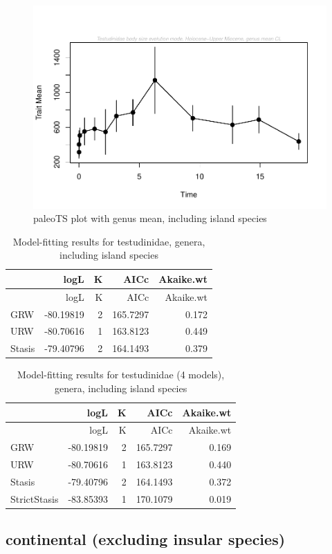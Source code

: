 \documentclass[]{article}
\begin{document}
\begin{figure}[htbp]
\centering
\includegraphics{MA_JJ_files/figure-latex/paleoTS plot with genus mean, including island species-1.pdf}
\caption{paleoTS plot with genus mean, including island species}
\end{figure}

\begin{longtable}[]{@{}lrrrr@{}}
\caption{Model-fitting results for testudinidae, genera, including
island species}\tabularnewline
\toprule
& logL & K & AICc & Akaike.wt\tabularnewline
\midrule
\endfirsthead
\toprule
& logL & K & AICc & Akaike.wt\tabularnewline
\midrule
\endhead
GRW & -80.19819 & 2 & 165.7297 & 0.172\tabularnewline
URW & -80.70616 & 1 & 163.8123 & 0.449\tabularnewline
Stasis & -79.40796 & 2 & 164.1493 & 0.379\tabularnewline
\bottomrule
\end{longtable}

\begin{longtable}[]{@{}lrrrr@{}}
\caption{Model-fitting results for testudinidae (4 models), genera,
including island species}\tabularnewline
\toprule
& logL & K & AICc & Akaike.wt\tabularnewline
\midrule
\endfirsthead
\toprule
& logL & K & AICc & Akaike.wt\tabularnewline
\midrule
\endhead
GRW & -80.19819 & 2 & 165.7297 & 0.169\tabularnewline
URW & -80.70616 & 1 & 163.8123 & 0.440\tabularnewline
Stasis & -79.40796 & 2 & 164.1493 & 0.372\tabularnewline
StrictStasis & -83.85393 & 1 & 170.1079 & 0.019\tabularnewline
\bottomrule
\end{longtable}

\newpage

\subsection{continental (excluding insular
species)}\label{continental-excluding-insular-species}
\end{document}
